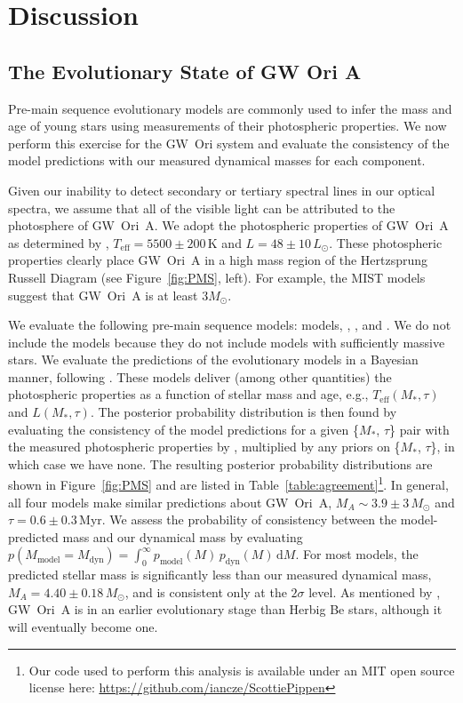 \documentclass[twocolumn]{aastex6}
\begin{document}
\section{Discussion}

\subsection{The Evolutionary State of GW Ori A}
Pre-main sequence evolutionary models are commonly used to infer the mass and age of young stars using measurements of their photospheric properties. We now perform this exercise for the GW~Ori system and evaluate the consistency of the model predictions with our measured dynamical masses for each component.

Given our inability to detect secondary or tertiary spectral lines in our optical spectra, we assume that all of the visible light can be attributed to the photosphere of GW~Ori~A. We adopt the photospheric properties of GW~Ori~A as determined by \citet{fang14}, $T_\mathrm{eff} = 5500 \pm 200\,\mathrm{K}$ and $L = 48 \pm 10\,L_\odot$. These photospheric properties clearly place GW~Ori~A in a high mass region of the Hertzsprung Russell Diagram (see Figure~\ref{fig:PMS}, left). For example, the MIST models suggest that GW~Ori~A is at least $3 M_\odot$.

We evaluate the following pre-main sequence models: \citet{choi16} models, \citet{dotter08}, \citet{tognelli11}, and \citet{siess00}. We do not include the \citet{baraffe15} models because they do not include models with sufficiently massive stars. We evaluate the predictions of the evolutionary models in a Bayesian manner, following \citet{jorgensen05}. These models deliver (among other quantities) the photospheric properties as a function of stellar mass and age,
e.g., $T_\mathrm{eff}(M_\ast, \tau)$ and $L(M_\ast, \tau)$. The posterior probability distribution is then found by evaluating the consistency of the model predictions for a given \{$M_\ast$, $\tau$\} pair with the measured photospheric properties by \citet{fang14}, multiplied by any priors on  \{$M_\ast$, $\tau$\}, in which case we have none. The resulting posterior probability distributions are shown in Figure~\ref{fig:PMS} and are listed in Table~\ref{table:agreement}\footnote{Our code used to perform this analysis is available under an MIT open source license here: \url{https://github.com/iancze/ScottiePippen}}. In general, all four models make similar predictions about GW~Ori~A, $M_A \sim 3.9 \pm 3\,M_\odot$ and $\tau = 0.6 \pm 0.3\,$Myr. We assess the probability of consistency between the model-predicted mass and our dynamical mass by evaluating $p(M_\mathrm{model} = M_\mathrm{dyn}) = \int_0^\infty p_\mathrm{model}(M) \, p_\mathrm{dyn}(M) \, \mathrm{d}M$. For most models, the predicted stellar mass is significantly less than our measured dynamical mass, $M_A = 4.40 \pm 0.18\,M_\odot$, and is consistent only at the $2\sigma$ level. As mentioned by \citet{fang14}, GW~Ori~A is in an earlier evolutionary stage than Herbig Be stars, although it will eventually become one.
\end{document}
